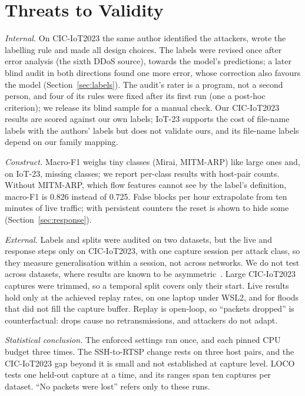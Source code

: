 \section{Threats to Validity}\label{sec:threats}

\emph{Internal.} On CIC-IoT2023 the same author identified the attackers, wrote the labelling rule and made all design choices. The labels were revised once after error analysis (the sixth DDoS source), towards the model's predictions; a later blind audit in both directions found one more error, whose correction also favours the model (Section~\ref{sec:labels}). The audit's rater is a program, not a second person, and four of its rules were fixed after its first run (one a post-hoc criterion); we release its blind sample for a manual check. Our CIC-IoT2023 results are scored against our own labels; IoT-23 supports the cost of file-name labels with the authors' labels but does not validate ours, and its file-name labels depend on our family mapping.

\emph{Construct.} Macro-F1 weighs tiny classes (Mirai, MITM-ARP) like large ones and, on IoT-23, missing classes; we report per-class results with host-pair counts. Without MITM-ARP, which flow features cannot see by the label's definition, macro-F1 is 0.826 instead of 0.725. False blocks per hour extrapolate from ten minutes of live traffic; with persistent counters the reset is shown to hide some (Section~\ref{sec:response}).

\emph{External.} Labels and splits were audited on two datasets, but the live and response steps only on CIC-IoT2023, with one capture session per attack class, so they measure generalisation within a session, not across networks. We do not test across datasets, where results are known to be asymmetric~\cite{ali2026siamxbert}. Large CIC-IoT2023 captures were trimmed, so a temporal split covers only their start. Live results hold only at the achieved replay rates, on one laptop under WSL2, and for floods that did not fill the capture buffer. Replay is open-loop, so ``packets dropped'' is counterfactual: drops cause no retransmissions, and attackers do not adapt.

\emph{Statistical conclusion.} The enforced settings ran once, and each pinned CPU budget three times. The SSH-to-RTSP change rests on three host pairs, and the CIC-IoT2023 gap beyond it is small and not established at capture level. LOCO tests one held-out capture at a time, and its ranges span ten captures per dataset. ``No packets were lost'' refers only to these runs.


